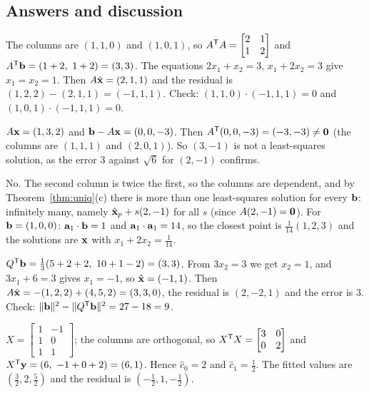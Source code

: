 \documentclass[11pt]{article}
\begin{document}
\subsection*{Answers and discussion}
\begin{description}[leftmargin=0pt,itemsep=5pt]
  \item[Knowledge Check \ref{kc:kcnormal}.] The columns are $(1,1,0)$ and $(1,0,1)$, so $A^{\mathsf T} A=\begin{bmatrix}2&1\\1&2\end{bmatrix}$ and $A^{\mathsf T}\mathbf{b}=(1+2,\ 1+2)=(3,3)$. The equations $2x_1+x_2=3$, $x_1+2x_2=3$ give $x_1=x_2=1$. Then $A\hat{\mathbf{x}}=(2,1,1)$ and the residual is $(1,2,2)-(2,1,1)=(-1,1,1)$. Check: $(1,1,0)\cdot(-1,1,1)=0$ and $(1,0,1)\cdot(-1,1,1)=0$.
  \item[Knowledge Check \ref{kc:kctest}.] $A\mathbf{x}=(1,3,2)$ and $\mathbf{b}-A\mathbf{x}=(0,0,-3)$. Then $A^{\mathsf T}(0,0,-3)=(-3,-3)\neq\mathbf{0}$ (the columns are $(1,1,1)$ and $(2,0,1)$). So $(3,-1)$ is not a least-squares solution, as the error $3$ against $\sqrt6$ for $(2,-1)$ confirms.
  \item[Knowledge Check \ref{kc:kcuniq}.] No. The second column is twice the first, so the columns are dependent, and by Theorem~\ref{thm:uniq}(c) there is more than one least-squares solution for every $\mathbf{b}$: infinitely many, namely $\hat{\mathbf{x}}_p+s(2,-1)$ for all $s$ (since $A(2,-1)=\mathbf{0}$). For $\mathbf{b}=(1,0,0)$: $\mathbf{a}_1\cdot\mathbf{b}=1$ and $\mathbf{a}_1\cdot\mathbf{a}_1=14$, so the closest point is $\tfrac1{14}(1,2,3)$ and the solutions are $\mathbf{x}$ with $x_1+2x_2=\tfrac1{14}$.
  \item[Knowledge Check \ref{kc:kcqr}.] $Q\T\bv{b}=\tfrac13(5+2+2,\ 10+1-2)=(3,3)$. From $3x_2=3$ we get $x_2=1$, and $3x_1+6=3$ gives $x_1=-1$, so $\hat{\mathbf{x}}=(-1,1)$. Then $A\hat{\mathbf{x}}=-(1,2,2)+(4,5,2)=(3,3,0)$, the residual is $(2,-2,1)$ and the error is $3$. Check: $\lVert\mathbf{b}\rVert^2-\lVert Q^{\mathsf T}\mathbf{b}\rVert^2=27-18=9$.
  \item[Knowledge Check \ref{kc:kcfit}.] $X=\begin{bmatrix}1&-1\\1&0\\1&1\end{bmatrix}$; the columns are orthogonal, so $X^{\mathsf T} X=\begin{bmatrix}3&0\\0&2\end{bmatrix}$ and $X^{\mathsf T}\mathbf{y}=(6,\ -1+0+2)=(6,1)$. Hence $\hat{c}_0=2$ and $\hat{c}_1=\tfrac12$. The fitted values are $(\tfrac32,2,\tfrac52)$ and the residual is $(-\tfrac12,1,-\tfrac12)$.

\end{description}
\end{document}
